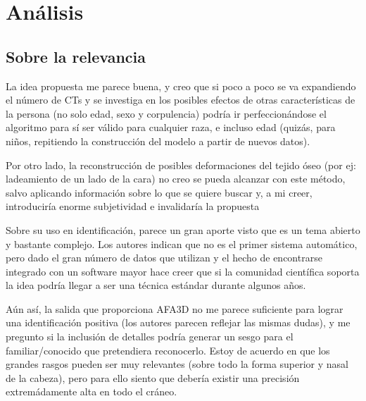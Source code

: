\documentclass[13pt,a4paper]{article}
\begin{document}
\section{Análisis}

\subsection{Sobre la relevancia}

La idea propuesta me parece buena, y creo que si poco a poco se va expandiendo el número de CTs y se investiga en los posibles efectos de otras características de la persona (no solo edad, sexo y corpulencia) podría ir perfeccionándose el algoritmo para sí ser válido para cualquier raza, e incluso edad (quizás, para niños, repitiendo la construcción del modelo a partir de nuevos datos).

Por otro lado, la reconstrucción de posibles deformaciones del tejido óseo (por ej: ladeamiento de un lado de la cara) no creo se pueda alcanzar con este método, salvo aplicando información sobre lo que se quiere buscar y, a mi creer, introduciría enorme subjetividad e invalidaría la propuesta




Sobre su uso en identificación, parece un gran aporte visto que es un tema abierto y bastante complejo. Los autores indican que no es el primer sistema automático, pero dado el gran número de datos que utilizan y el hecho de encontrarse integrado con un software mayor hace creer que si la comunidad científica soporta la idea podría llegar a ser una técnica estándar durante algunos años.


Aún así, la salida que proporciona AFA3D no me parece suficiente para lograr una identificación positiva (los autores parecen reflejar las mismas dudas), y me pregunto si la inclusión de detalles podría generar un sesgo para el familiar/conocido que pretendiera reconocerlo. Estoy de acuerdo en que los grandes rasgos pueden ser muy relevantes (sobre todo la forma superior y nasal de la cabeza), pero para ello siento que debería existir una precisión extremádamente alta en todo el cráneo.
\end{document}
